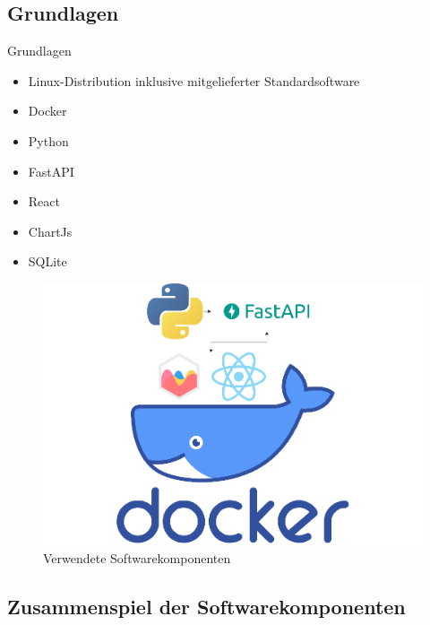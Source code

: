 \documentclass[10pt,ngerman]{beamer}
\begin{document}
\subsection{Grundlagen}
\begin{frame}[fragile]{Grundlagen}
    \begin{minipage}[t]{0.49\textwidth}
      \begin{itemize}
        \item Linux-Distribution inklusive mitgelieferter Standardsoftware
        \item Docker
        \item Python
        \item FastAPI
        \item React
        \item ChartJs
        \item SQLite
      \end{itemize}
    \end{minipage}
    \begin{minipage}[t]{0.49\textwidth}
      \begin{figure}
        \centering
        \captionsetup{justification=centering}
        \includegraphics[width=1\textwidth]{pictures/SoftwareKomponenten.png}
        \caption{Verwendete Softwarekomponenten}
      \end{figure}
    \end{minipage}
\end{frame}

\subsection{Zusammenspiel der Softwarekomponenten}
\end{document}
